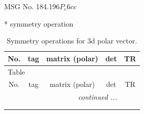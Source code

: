 \documentclass[fleqn,8pt]{jsarticle}
\begin{document}
\setcounter{MaxMatrixCols}{32}

\renewcommand{\tablename}{Table~}
\renewcommand{\figurename}{Figure~}
\begin{center}
\LARGE
MSG No. 184.196\quad$P_{c}6cc$
\end{center}
* symmetry operation
\renewcommand{\arraystretch}{1.3}
\begin{longtable}{ccccc}
\caption{Symmetry operations for 3d polar vector.}
 \\
 \hline \hline
No. & tag & matrix (polar) & det & TR \\ \hline \endfirsthead

\multicolumn{4}{l}{\tablename\ \thetable{}} \\
 \hline \hline
No. & tag & matrix (polar) & det & TR \\ \hline \endhead

 \hline \hline
\multicolumn{4}{r}{\footnotesize\it continued ...} \\ \endfoot

 \hline \hline
\multicolumn{4}{r}{} \\ \endlastfoot


\end{longtable}
\end{document}
